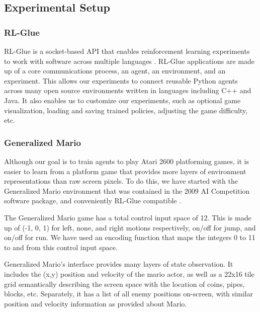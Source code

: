 \documentclass{article}
\begin{document}
\subsection{Experimental Setup}

\subsubsection{RL-Glue}
RL-Glue is a socket-based API that enables reinforcement learning experiments to work with software across multiple languages \cite{Tanner09}. RL-Glue applications are made up of a core communications process, an agent, an environment, and an experiment. This allows our experiments to connect reusable Python agents across many open source environments written in languages including C++ and Java. It also enables us to customize our experiments, such as optional game visualization, loading and saving trained policies, adjusting the game difficulty, etc.

\subsubsection{Generalized Mario}
Although our goal is to train agents to play Atari 2600 platforming games, it is easier to learn from a platform game that provides more layers of environment representations than raw screen pixels. To do this, we have started with the Generalized Mario environment that was contained in the 2009 AI Competition software package, and conveniently RL-Glue compatible \cite{Togelius10}.

The Generalized Mario game has a total control input space of 12. This is made up of (-1, 0, 1) for left, none, and right motions respectively, on/off for jump, and on/off for run. We have used an encoding function that maps the integers 0 to 11 to and from this control input space. 

Generalized Mario's interface provides many layers of state observation. It includes the (x,y) position and velocity of the mario actor, as well as a 22x16 tile grid semantically describing the screen space with the location of coins, pipes, blocks, etc. Separately, it has a list of all enemy positions on-screen, with similar position and velocity information as provided about Mario. 
\end{document}
